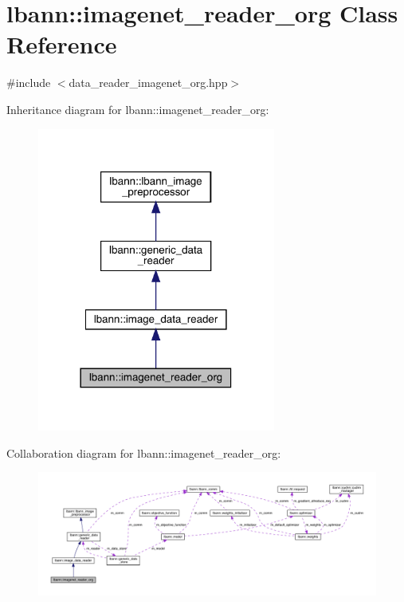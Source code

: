 \hypertarget{classlbann_1_1imagenet__reader__org}{}\section{lbann\+:\+:imagenet\+\_\+reader\+\_\+org Class Reference}
\label{classlbann_1_1imagenet__reader__org}


{\ttfamily \#include $<$data\+\_\+reader\+\_\+imagenet\+\_\+org.\+hpp$>$}



Inheritance diagram for lbann\+:\+:imagenet\+\_\+reader\+\_\+org\+:\nopagebreak
\begin{figure}[H]
\begin{center}
\leavevmode
\includegraphics[width=222pt]{classlbann_1_1imagenet__reader__org__inherit__graph}
\end{center}
\end{figure}


Collaboration diagram for lbann\+:\+:imagenet\+\_\+reader\+\_\+org\+:\nopagebreak
\begin{figure}[H]
\begin{center}
\leavevmode
\includegraphics[width=350pt]{classlbann_1_1imagenet__reader__org__coll__graph}
\end{center}
\end{figure}
